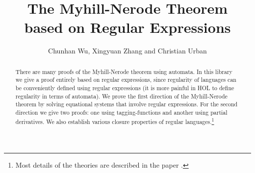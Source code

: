 \documentclass[11pt,a4paper]{article}
\begin{document}
\title{The Myhill-Nerode Theorem\\ based on Regular Expressions}
\author{Chunhan Wu, Xingyuan Zhang and Christian Urban}
\maketitle

\begin{abstract}
There are many proofs of the Myhill-Nerode theorem using automata. In this
library we give a proof entirely based on regular expressions, since
regularity of languages can be conveniently defined using regular expressions
(it is more painful in HOL to define regularity in terms of automata).  We
prove the first direction of the Myhill-Nerode theorem by solving equational
systems that involve regular expressions.  For the second direction we give two
proofs: one using tagging-functions and another using partial derivatives. We
also establish various closure properties of regular languages.\footnote{Most
details of the theories are described in the paper \cite{WuZhangUrban11}.}
\end{abstract}

\tableofcontents
\bigskip





\end{document}

